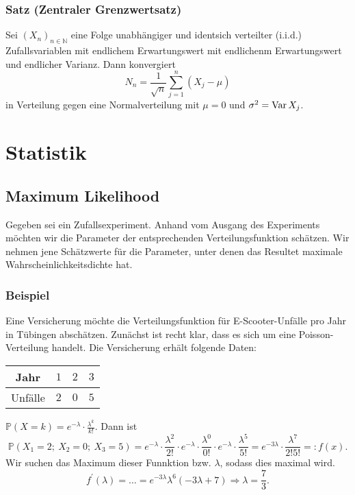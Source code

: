 \subsubsection{Satz (Zentraler Grenzwertsatz)}
Sei $(X_n)_{n\in\mathbb{N}}$ eine Folge unabh\"angiger und identsich verteilter (i.i.d.) Zufallsvariablen mit endlichem Erwartungswert mit endlichenm Erwartungswert und endlicher Varianz. Dann konvergiert
\[
N_n=\frac{1}{\sqrt{n}}\sum_{j=1}^n(X_j-\mu)
\]
in Verteilung gegen eine Normalverteilung mit $\mu=0$ und $\sigma^2=\operatorname{Var} X_j$.
\newpage
\section{Statistik}
\subsection{Maximum Likelihood}
Gegeben sei ein Zufallsexperiment. Anhand vom Ausgang des Experiments m\"ochten wir die Parameter der entsprechenden Verteilungsfunktion sch\"atzen. Wir nehmen jene Sch\"atzwerte f\"ur die Parameter, unter denen das Resultet maximale Wahrscheinlichkeitsdichte hat.
\subsubsection{Beispiel}
Eine Versicherung m\"ochte die Verteilungsfunktion f\"ur E-Scooter-Unf\"alle pro Jahr in T\"ubingen absch\"atzen. Zun\"achst ist recht klar, dass es sich um eine Poisson-Verteilung handelt. Die Versicherung erh\"alt folgende Daten:
\begin{center}
\begin{tabular}{c|c|c|c}
Jahr&$1$&$2$&$3$\\
\hline
Unf\"alle&$2$&$0$&$5$\\
\end{tabular}
\end{center}
$\mathbb{P}(X=k)=e^{-\lambda}\cdot\frac{\lambda^k}{k!}$. Dann ist
\[
\mathbb{P}(X_1=2;\ X_2=0;\ X_3=5)=
e^{-\lambda}\cdot\frac{\lambda^2}{2!}
\cdot
e^{-\lambda}\cdot\frac{\lambda^0}{0!}
\cdot
e^{-\lambda}\cdot\frac{\lambda^5}{5!}
=e^{-3\lambda}\cdot\frac{\lambda^7}{2!5!}=:f(x).
\]
Wir suchen das Maximum dieser Funnktion bzw. $\lambda$, sodass dies maximal wird.
\[
f^\prime(\lambda)=\ldots=e^{-3\lambda}\lambda^6(-3\lambda+7)\Rightarrow\lambda=\frac{7}{3}.
\]
